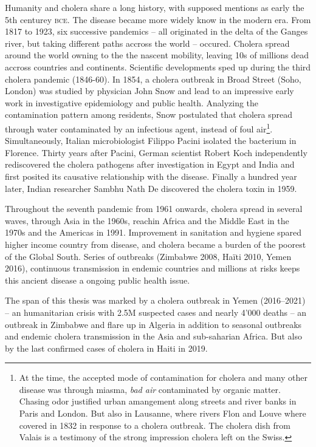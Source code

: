 Humanity and cholera share a long history, with supposed mentions as early the 5th centurey \textsc{bce}. The disease became more widely know in the modern era. From 1817 to 1923, six successive pandemics -- all originated in the delta of the Ganges river, but taking different paths accross the world -- occured. Cholera spread around the world owning to the the nascent mobility, leaving 10s of millions dead accross countries and continents.  Scientific developments sped up during the third cholera pandemic (1846-60). In 1854, a cholera outbreak in Broad Street (Soho, London) was studied by physician John Snow and lead to an impressive early work in investigative epidemiology and public health. Analyzing the contamination pattern among residents, Snow postulated that cholera spread through water contaminated by an infectious agent, instead of foul air\footnote{At the time, the accepted mode of contamination for cholera and many other disease was through miasma, \textit{bad air} contaminated by organic matter. Chasing odor  justified urban amangement along streets and river banks in Paris and London. But also in Lausanne, where rivers Flon and Louve where covered in 1832 in response to a cholera outbreak. The cholera dish from Valais is a testimony of the strong impression cholera left on the Swiss.}.  Simultaneously, Italian microbiologist Filippo Pacini isolated the bacterium in Florence. Thirty years after Pacini, German scientist Robert Koch independently rediscovered the cholera pathogens after investigation in Egypt and India and first posited its causative relationship with the disease. Finally a hundred year later, Indian researcher Sambhu Nath De discovered the cholera toxin in 1959.

Throughout the seventh pandemic from 1961 onwards, cholera spread in several waves, through Asia in the 1960s, reachin Africa and the Middle East in the 1970s and the Americas in 1991\cite{Mutreja:EvidenceSeveralWaves:2011}. Improvement in sanitation and hygiene spared higher income country from disease, and cholera became a burden of the poorest of the Global South. Series of outbreaks (\eg Zimbabwe 2008, Haïti 2010, Yemen 2016), continuous transmission in endemic countries and millions at risks keeps this ancient disease a ongoing public health issue.

The span of this thesis was marked by a cholera outbreak in Yemen (2016--2021) -- an humanitarian crisis with 2.5M suspected cases and nearly 4'000 deaths -- an outbreak in Zimbabwe and flare up in Algeria in addition to seasonal outbreaks and endemic cholera transmission in the Asia and sub-saharian Africa.  But also by the last confirmed cases of cholera in Haiti in 2019.

